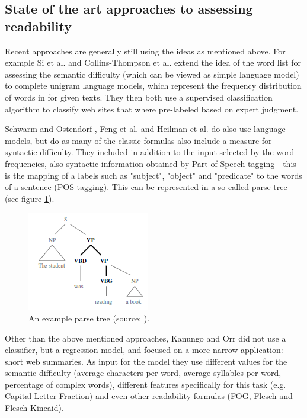 \documentclass[runningheads,a4paper]{llncs}
\begin{document}
\subsection{State of the art approaches to assessing readability}\label{sec:stateof}

Recent approaches are generally still using the ideas as mentioned above. For example Si et al. \cite{Si2001} and Collins-Thompson et al. \cite{Collins-Thompson2004} extend the idea of the word list for assessing the semantic difficulty (which can be viewed as simple language model) to complete unigram language models, which represent the frequency distribution of words in for given texts. They then both use a supervised classification algorithm to classify web sites that where pre-labeled based on expert judgment.

Schwarm and Ostendorf \cite{Schwarm2005}, Feng et al. \cite{Feng2010} and Heilman et al. \cite{Heilman2007} do also use language models, but do as many of the classic formulas also include a measure for syntactic difficulty. They included in addition to the input selected by the word frequencies, also syntactic information obtained by Part-of-Speech tagging - this is the mapping of a labels such as "subject", "object" and "predicate" to the words of a sentence (POS-tagging). This can be represented in a so called parse tree (see figure \ref{fig:parse_tree}).

\begin{figure}
\centering
\includegraphics[]{Bilder/parse_tree.png}
\caption{An example parse tree (source: \cite{Heilman2007}).}
\label{fig:parse_tree}
\end{figure}

Other than the above mentioned approaches, Kanungo and Orr \cite{Kanungo2009} did not use a classifier, but a regression model, and focused on a more narrow application: short web summaries. As input for the model they use different values for the semantic difficulty (average characters per word, average syllables per word, percentage of complex words), different features specifically for this task (e.g. Capital Letter Fraction) and even other readability formulas (FOG, Flesch and Flesch-Kincaid).
\end{document}
